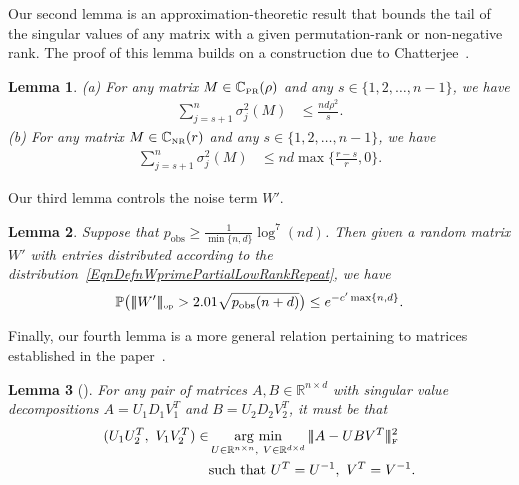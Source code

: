 \documentclass[11pt, hidelinks]{article} %
\newtheorem{lemma}{Lemma}
\newcommand{\matsnorm}[2]{|\!|\!| #1 | \! | \!|_{{#2}}}
\newcommand{\opnorm}[1]{\ensuremath{\matsnorm{#1}{\mbox{\tiny{op}}}}}
\newcommand{\frobnorm}[1]{\ensuremath{\matsnorm{#1}{\mbox{\tiny{F}}}}}
\newcommand{\argmin}{\operatornamewithlimits{arg~min}}
\newcommand{\reals}{\ensuremath{\mathbb{R}}}
\newcommand{\mprob}{\ensuremath{\mathbb{P}}}
\newcommand{\numrows}{n}
\newcommand{\numcols}{d}
\newcommand{\plaincon}{c}
\newcommand{\wtmatrix}{M}
\newcommand{\wt}{\wtmatrix}
\newcommand{\matrixset}{\mathbb{C}}
\newcommand{\nnset}{\matrixset_{\mbox{\tiny NR}}}
\newcommand{\permset}{\matrixset_{\mbox{\tiny PR}}}
\newcommand{\pp}{\ensuremath{p_{\mathrm{obs}}}}
\newcommand{\nnrank}{r}
\newcommand{\permrank}{\rho}
\newcommand{\noise}{W}
\newcommand{\mxtempone}{A}
\newcommand{\mxtemptwo}{B}
\newcommand{\mxdiag}{D}
\newcommand{\mxU}{U}
\newcommand{\mxV}{V}
\begin{document}
\noindent Our second lemma is an approximation-theoretic result that bounds the tail of the singular values of any matrix with a given permutation-rank or non-negative rank. The proof of this lemma builds on a construction due to Chatterjee~\cite{chatterjee2014matrix}.
%
\begin{lemma}
	\label{LemSTSVDChatterjee}
	(a) For any matrix $\wt \in \permset(\permrank)$ and any $s \in \{1, 2,
	\ldots, \numrows - 1 \}$, we have
	\begin{align*}
	\sum_{j=s+1}^\numrows \sigma^2_j(\wt) & \leq
	\frac{\numrows \numcols \permrank^2}{s}.
	\end{align*}
	(b) For any matrix $\wt \in \nnset(\nnrank)$ and any $s \in \{1, 2,
	\ldots, \numrows - 1 \}$, we have
	\begin{align*}
	\sum_{j=s+1}^\numrows \sigma^2_j(\wt) & \leq
	\numrows \numcols \max\big\{ \frac{\nnrank - s}{\nnrank}, 0\big\}.
	\end{align*}
\end{lemma}

\noindent Our third lemma controls the noise term $\noise'$.
%
\begin{lemma}
  \label{LemWOp}
  Suppose that $\pp \geq \frac{1}{\min\{\numrows,\numcols\}}\log^7(\numrows \numcols)$. Then given a random matrix $\noise'$ with entries distributed according
  to the distribution~\eqref{EqnDefnWprimePartialLowRankRepeat}, we
  have
  \begin{align*}
    \mprob \big( \opnorm{ \noise' } > 2.01 \sqrt{\pp (\numrows +
      \numcols) } \big) \leq e^{- \plaincon' \max\{\numrows,
      \numcols\}}.
  \end{align*}
\end{lemma}

Finally, our fourth lemma is a more general relation pertaining to matrices established in the paper~\cite{schonemann1968two}. %
\begin{lemma}[\cite{schonemann1968two}]
	\label{LemAlignedIsClosest}
	For any pair of matrices $\mxtempone, \mxtemptwo \in \reals^{\numrows \times \numcols}$ with singular value decompositions $\mxtempone = \mxU_{1} \mxdiag_{1} \mxV_{1}^T$ and $\mxtemptwo = \mxU_2 \mxdiag_2 \mxV_2^T$, it must be that
	\begin{align}
	\label{EqnAlignedIsClosest}
	(\mxU_{1} \mxU_{2}^T, \ \mxV_1 \mxV_2^T)	\in & \argmin_{ \mxU \in \reals^{\numrows \times \numrows}, \  \mxV \in \reals^{\numcols \times \numcols}  } \frobnorm{\mxtempone - \mxU \mxtemptwo \mxV^T}^2 \\ & \mbox{such that }\mxU^T = \mxU^{-1},\ \mxV^T = \mxV^{-1}. \nonumber
	\end{align}
\end{lemma}
\end{document}
